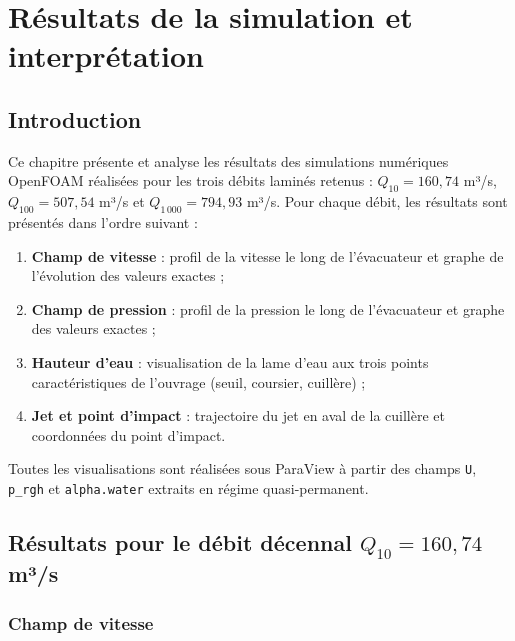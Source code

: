 \chapter{Résultats de la simulation et interprétation}
\label{chap:resultats_simulation}

\section{Introduction}
\label{sec:intro_resultats}

Ce chapitre présente et analyse les résultats des simulations numériques OpenFOAM réalisées pour les trois débits laminés retenus : $Q_{10} = 160{,}74$ m³/s, $Q_{100} = 507{,}54$ m³/s et $Q_{1\,000} = 794{,}93$ m³/s. Pour chaque débit, les résultats sont présentés dans l'ordre suivant :
\begin{enumerate}
    \item \textbf{Champ de vitesse} : profil de la vitesse le long de l'évacuateur et graphe de l'évolution des valeurs exactes ;
    \item \textbf{Champ de pression} : profil de la pression le long de l'évacuateur et graphe des valeurs exactes ;
    \item \textbf{Hauteur d'eau} : visualisation de la lame d'eau aux trois points caractéristiques de l'ouvrage (seuil, coursier, cuillère) ;
    \item \textbf{Jet et point d'impact} : trajectoire du jet en aval de la cuillère et coordonnées du point d'impact.
\end{enumerate}

Toutes les visualisations sont réalisées sous ParaView \cite{ayachit2015paraview} à partir des champs \texttt{U}, \texttt{p\_rgh} et \texttt{alpha.water} extraits en régime quasi-permanent.

\section{Résultats pour le débit décennal $Q_{10} = 160{,}74$ m³/s}
\label{sec:resultats_q10}

\subsection{Champ de vitesse}
\label{subsec:q10_vitesse}

